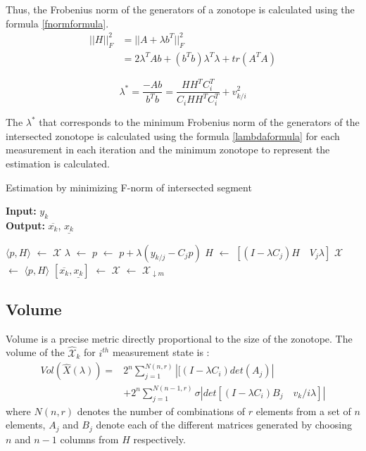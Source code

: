 Thus, the Frobenius norm of the generators of a zonotope is calculated using the formula \eqref{fnormformula}\cite{Alamo2005}.
\begin{equation}
\label{fnormformula}
\begin{split}
||H||_{F}^2 & = ||A + \lambda b^T||^{2}_F \\
&= 2\lambda^T A b+ (b^Tb)\lambda^T\lambda + tr(A^TA)
\end{split}
\end{equation}

\begin{equation}
\label{lambdaformula}
\lambda^* = \frac{-Ab }{b^Tb}  = \frac{HH^TC_i^T}{C_i HH^TC_i^T} + v_{k/i}^2
\end{equation}

The $\lambda^*$ that corresponds to the minimum Frobenius norm of the generators of the intersected zonotope is calculated using the formula \eqref{lambdaformula} for each measurement in each iteration and the minimum zonotope to represent the estimation is calculated.


\begin{algorithm}
		
        \caption{Estimation by minimizing F-norm of intersected segment}
        \textbf{Input:} $y_k$\\
 		\textbf{Output:} $\overline{x_k}$, $\underline{x_k}$
        \begin{algorithmic}[1]
        \State $\langle p,H \rangle$ $\gets$ $\mathcal{X}$
        	\State $\lambda$ $\gets$ 
        	\State $p$ $\gets$ $p + \lambda (y_{k/j} - C_j p)$
        	\State $H$ $\gets$ $[(I- \lambda C_j)H \quad V_j\lambda]$ 
        \EndFor
        \State $\mathcal{X}$ $\gets$ $\langle p, H \rangle$
        \State $[\overline{x_k}, \underline{x_k}]$ $\gets$ 
        \State $\mathcal{X}$ $\gets$ $\mathcal{X}_{\downarrow m}$
        \end{algorithmic}
        \label{alg:fnorm}
\end{algorithm}
\subsection{Volume}
Volume is a precise metric directly proportional to the size of the zonotope. The volume of the $\mathcal{\hat{X}}_k$ for $i^{th}$ measurement state is \cite{Alamo2005}:
\begin{equation}
\label{volumeformula}
\begin{split}
Vol(\hat{X}(\lambda))=& 2^n \sum^{N(n,r)}_{j=1} |[(I - \lambda C_i)det(A_j)|\\
&+ 2^n \sum^{N(n-1,r)}_{j=1} \sigma|det[(I- \lambda C_i)B_j\quad v_k/i\lambda]|
\end{split}
\end{equation}
where $N(n,r)$ denotes the number of combinations of $r$ elements from a set of $n$ elements, $A_j$ and $B_j$ denote each of the different matrices generated by choosing $n$ and $n-1$ columns from $H$ respectively. 

